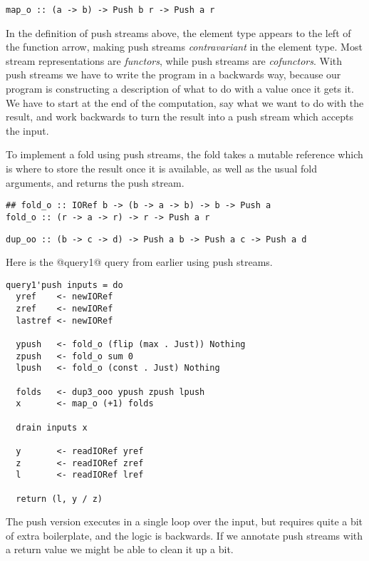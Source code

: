 \begin{lstlisting}
map_o :: (a -> b) -> Push b r -> Push a r
\end{lstlisting}

In the definition of push streams above, the element type appears to the left of the function arrow, making push streams \emph{contravariant} in the element type.
Most stream representations are \emph{functors}, while push streams are \emph{cofunctors}.
With push streams we have to write the program in a backwards way, because our program is constructing a description of what to do with a value once it gets it.
We have to start at the end of the computation, say what we want to do with the result, and work backwards to turn the result into a push stream which accepts the input.

To implement a fold using push streams, the fold takes a mutable reference which is where to store the result once it is available, as well as the usual fold arguments, and returns the push stream.

\begin{lstlisting}
## fold_o :: IORef b -> (b -> a -> b) -> b -> Push a
fold_o :: (r -> a -> r) -> r -> Push a r
\end{lstlisting}

\begin{lstlisting}
dup_oo :: (b -> c -> d) -> Push a b -> Push a c -> Push a d
\end{lstlisting}

Here is the @query1@ query from earlier using push streams.

\begin{lstlisting}
query1'push inputs = do
  yref    <- newIORef
  zref    <- newIORef
  lastref <- newIORef

  ypush   <- fold_o (flip (max . Just)) Nothing
  zpush   <- fold_o sum 0
  lpush   <- fold_o (const . Just) Nothing

  folds   <- dup3_ooo ypush zpush lpush
  x       <- map_o (+1) folds

  drain inputs x

  y       <- readIORef yref
  z       <- readIORef zref
  l       <- readIORef lref

  return (l, y / z)
\end{lstlisting}

The push version executes in a single loop over the input, but requires quite a bit of extra boilerplate, and the logic is backwards.
If we annotate push streams with a return value we might be able to clean it up a bit.

